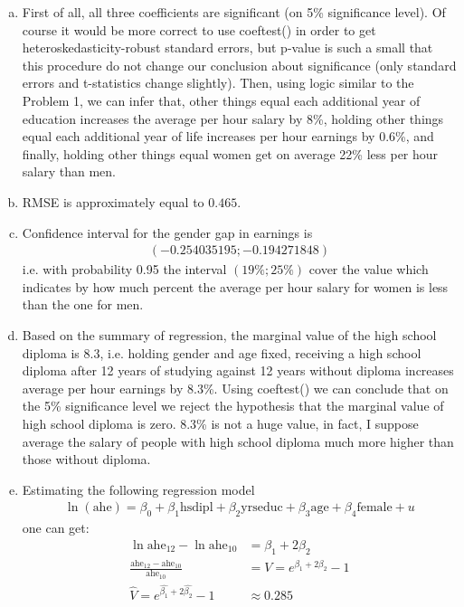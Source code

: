 \documentclass[a4paper]{article}
\begin{document}
\begin{enumerate}[(a)]
	\item First of all, all three coefficients are significant (on 5\% significance level). Of course it would be more correct to use coeftest() in order to get heteroskedasticity-robust standard errors, but p-value is such a small that this procedure do not change our conclusion about significance (only standard errors and t-statistics change slightly). Then, using logic similar to the Problem 1, we can infer that, other things equal each additional year of education increases the average per hour salary by 8\%, holding other things equal each additional year of life increases per hour earnings by 0.6\%, and finally, holding other things equal women get on average 22\% less per hour salary than men.
	\item RMSE is approximately equal to $0.465$.
	\item Confidence interval for the gender gap in earnings is
	\begin{align*}
	(-0.254035195; -0.194271848)
	\end{align*}
	i.e. with probability 0.95 the interval $(19\%; 25\%)$ cover the value which indicates by how much percent the average per hour salary for women is less than the one for men.
	\item Based on the summary of regression, the marginal value of the high school diploma is 8.3, i.e. holding gender and age fixed, receiving a high school diploma after 12 years of studying against 12 years without diploma increases average per hour earnings by 8.3\%. Using coeftest() we can conclude that on the 5\% significance level we reject the hypothesis that the marginal value of high school diploma is zero. 8.3\% is not a huge value, in fact, I suppose average the salary of people with high school diploma much more higher than those without diploma.
	\item 
	Estimating the following regression model
	\begin{align*}
	\ln(\text{ahe}) = \beta_0 + \beta_1 \text{hsdipl} + \beta_2 \text{yrseduc} + \beta_3 \text{age} + \beta_4\text{female} + u
	\end{align*}
	one can get:
	\begin{align*}
	\ln \text{ahe}_{12} - \ln \text{ahe}_{10} &= \beta_1 + 2 \beta_2\\
	\frac{\text{ahe}_{12} - \text{ahe}_{10}}{\text{ahe}_{10}} &= V = e^{\beta_1 + 2\beta_2} - 1 \\
	\hat{V} = e^{\hat{\beta_1} + 2\hat{\beta_2}} - 1 &\approx 0.285

\end{align*}
\end{enumerate}
\end{document}
